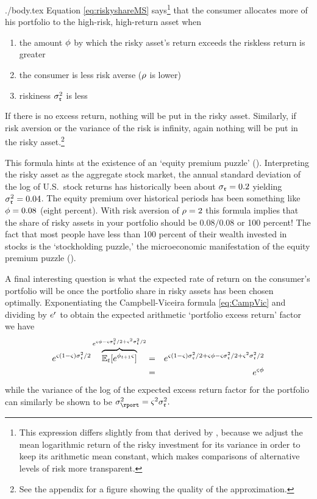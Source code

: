 \documentclass{bejournal}
\begin{document}
\begin{verbatimwrite}{./body.tex}
Equation \eqref{eq:riskyshareMS} says\footnote{This expression differs
  slightly from that derived by \cite{cvAppendix}, because we adjust
  the mean logarithmic return of the risky investment for its variance
  in order to keep its arithmetic mean constant, which makes
  comparisons of alternative levels of risk more transparent.}  that the
consumer allocates more of his portfolio to the high-risk, high-return
asset when
\begin{enumerate}
\item the amount $\phi$ by which the risky
asset's return exceeds the riskless return is greater
\item the consumer is less risk averse ($\rho$ is lower)
\item riskiness $\sigma^{2}_{\mathfrak{r}}$ is less
\end{enumerate}
If there is no excess return, nothing will be put in the risky asset.  Similarly, if 
risk aversion or the variance of the risk is infinity, again nothing 
will be put in the risky asset.\footnote{See the appendix for a figure
  showing the quality of the approximation.}

This formula hints at the existence of an `equity premium puzzle'
(\cite{mehra&prescott:puzzle}).  Interpreting the risky asset as the
aggregate stock market, the annual standard deviation of the log of
U.S.\ stock returns has historically been about $\sigma_{\mathfrak{r}}=0.2$
yielding $\sigma_{\mathfrak{r}}^{2} = 0.04$.  The equity premium over historical periods
has been something like $\phi = 0.08$ (eight percent).  With risk
aversion of $\rho=2$ this formula implies that the share of risky
assets in your portfolio should be $0.08/0.08$ or 100 percent!  The
fact that most people have less than 100 percent of their wealth
invested in stocks is the `stockholding puzzle,' the microeconomic
manifestation of the equity premium puzzle
(\cite{haliassos&bertaut:fewholdstocks}).

A final interesting question is what the expected rate of return on
the consumer's portfolio will be once the portfolio share in risky
assets has been chosen optimally.  Exponentiating the Campbell-Viceira
formula \eqref{eq:CampVic} and dividing by $e^{\mathsf{r}}$ to obtain the expected arithmetic `portfolio
excess return' factor we have
\begin{eqnarray}
  e^{{\varsigma}(1-{\varsigma})\sigma_{\mathfrak{r}}^{2}/2}\overbrace{\mathbb{E}_{t}[e^{\phi_{t+1}{\varsigma}}]}^{e^{{\varsigma} \phi - {\varsigma}\sigma_{\mathfrak{r}}^{2}/2+{\varsigma}^{2}\sigma_{\mathfrak{r}}^{2}/2}}  & = & e^{{\varsigma}(1-{\varsigma})\sigma_{\mathfrak{r}}^{2}/2+{\varsigma} \phi - {\varsigma} \sigma_{\mathfrak{r}}^{2}/2+{\varsigma}^{2}\sigma_{\mathfrak{r}}^{2}/2} 
\\ & = & e^{{\varsigma} \phi} \label{eq:eport}
\end{eqnarray}
while the variance of the log of the expected excess return factor for the portfolio can similarly be shown to be $\sigma^{2}_{\rport} = \riskyshare^{2} \sigma^{2}_{\risky}.$


\end{verbatimwrite}
\end{document}
